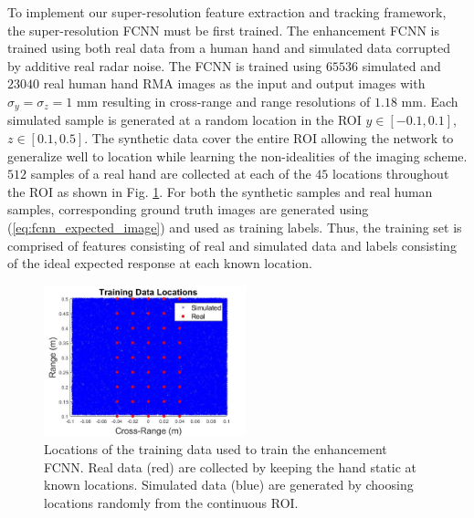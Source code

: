 \documentclass[10pt,journal,final]{IEEEtran}
\begin{document}
To implement our super-resolution feature extraction and tracking framework, the super-resolution FCNN must be first trained.
The enhancement FCNN is trained using both real data from a human hand and simulated data corrupted by additive real radar noise. 
The FCNN is trained using $65536$ simulated and $23040$ real human hand RMA images as the input and output images with $\sigma_y = \sigma_z = 1$ mm resulting in cross-range and range resolutions of $1.18$ mm. 
Each simulated sample is generated at a random location in the ROI $y \in [-0.1,0.1]$, $z \in [0.1,0.5]$.
The synthetic data cover the entire ROI allowing the network to generalize well to location while learning the non-idealities of the imaging scheme.
$512$ samples of a real hand are collected at each of the $45$ locations throughout the ROI as shown in Fig. \ref{fig:fcnn_training_locations}.
For both the synthetic samples and real human samples, corresponding ground truth images are generated using (\ref{eq:fcnn_expected_image}) and used as training labels.
Thus, the training set is comprised of features consisting of real and simulated data and labels consisting of the ideal expected response at each known location.

\begin{figure}[h]
	\centering
	\includegraphics[width=2.3in]{trainingLocations.jpg}
	\caption{Locations of the training data used to train the enhancement FCNN. Real data (red) are collected by keeping the hand static at known locations. Simulated data (blue) are generated by choosing locations randomly from the continuous ROI. 
	}
	\label{fig:fcnn_training_locations}
\end{figure}
\end{document}

